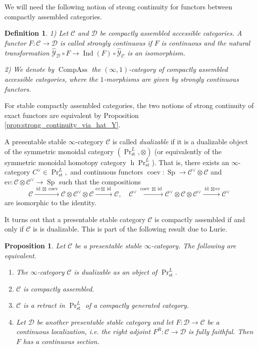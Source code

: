 \documentclass[11pt,leqno]{amsart}
\newtheorem{defi}[theo]{Definition}
\newtheorem{prop}[theo]{Proposition}
\numberwithin{equation}{section}
\def\h{\operatorname{h}}
\newcommand{\xto}{\xrightarrow}
\newcommand{\st}{\operatorname{st}}
\newcommand{\ev}{\mathrm ev}
\newcommand{\cD}{{\mathcal D}}
\newcommand{\cC}{{\mathcal C}}
\newcommand{\cY}{{\mathcal Y}}
\newcommand{\Compass}{\operatorname{CompAss}}
\newcommand{\Fun}{\operatorname{Fun}}
\newcommand{\Sp}{\operatorname{Sp}}
\newcommand{\Ind}{\operatorname{Ind}}
\newcommand{\id}{\operatorname{id}}
\newcommand{\coev}{\operatorname{coev}}
\begin{document}
We will need the following notion of strong continuity for functors between compactly assembled categories.

\begin{defi}\label{defi:strcont_general}1) Let $\cC$ and $\cD$ be compactly assembled accessible categories. A functor $F:\cC\to\cD$ is called strongly continuous if $F$ is continuous and the natural transformation $\hat{\cY}_{\cD}\circ F\to \Ind(F)\circ\hat{\cY}_{\cC}$ is an isomorphism.

2) We denote by $\Compass$ the $(\infty,1)$-category of compactly assembled accessible categories, where the $1$-morphisms are given by strongly continuous functors. 
\end{defi}

For stable compactly assembled categories, the two notions of strong continuity of exact functors are equivalent by Proposition \ref{prop:strong_continuity_via_hat_Y}.

 

A presentable stable $\infty$-category $\cC$ is called {\it dualizable} if it is a dualizable object of the symmetric monoidal category $(\Pr^L_{\st},\otimes)$ (or equivalently of the symmetric monoidal homotopy category $\h \Pr^L_{\st}$). That is, there exists an $\infty$-category $C^{\vee}\in \Pr_{\st}^L,$ and continuous functors $\coev:\Sp\to \cC^{\vee}\otimes\cC$ and $\ev:\cC\otimes\cC^{\vee}\to\Sp$ such that the compositions
$$\cC\xto{\id\boxtimes\coev}\cC\otimes\cC^{\vee}\otimes\cC\xto{\ev\boxtimes\id}\cC,\quad \cC^{\vee}\xto{\coev\boxtimes\id}\cC^{\vee}\otimes\cC\otimes\cC^{\vee}\xto{\id\boxtimes\ev}\cC^{\vee}$$
are isomorphic to the identity.

It turns out that a presentable stable category $\cC$ is compactly assembled if and only if $\cC$ is is dualizable. This is part of the following result due to Lurie.

\begin{prop}\label{prop:Lurie_criterions_dual}\cite[Proposition D.7.3.1]{Lur18} Let $\cC$ be a presentable stable $\infty$-category. The following are equivalent.

\begin{enumerate}[label=(\roman*),ref=(\roman*)]
\item The $\infty$-category $\cC$ is dualizable as an object of $\Pr^L_{\st}.$ \label{Lur1}

\item $\cC$ is compactly assembled. \label{Lur2}

\item $\cC$ is a retract in $\Pr^L_{\st}$ of a compactly generated category. \label{Lur3}

\item Let $\cD$ be another presentable stable category and let $F:\cD\to\cC$ be a continuous localization, i.e. the right adjoint $F^R:\cC\to\cD$ is fully faithful. Then $F$ has a continuous section.\label{Lur4}
\end{enumerate}
\end{prop}
\end{document}
